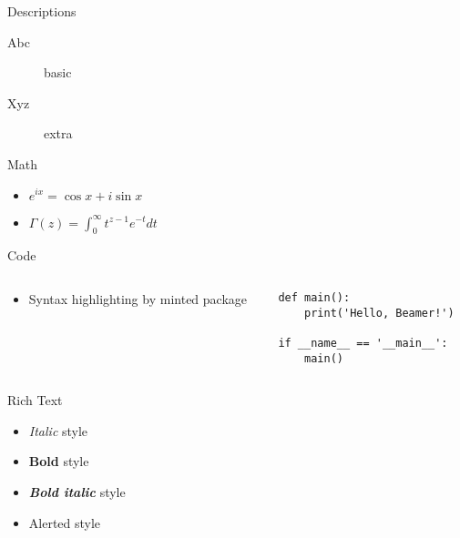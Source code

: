 \documentclass[12pt,t]{beamer}
\begin{document}
\begin{frame}{Descriptions}
  \begin{description}
  \item[Abc] basic
  \item[Xyz] extra
  \end{description}
\end{frame}


\begin{frame}[fragile]{Math}
  \begin{itemize}
    \item $e^{ix} = \cos x + i \sin x$
    \item $\Gamma(z) = \int_0^\infty t^{z-1} e^{-t} dt$
  \end{itemize}
\end{frame}


\begin{frame}[fragile]{Code}
  \begin{columns}
    \begin{column}{0.5\textwidth}
      \begin{itemize}
        \item Syntax highlighting by \alert{minted} package
      \end{itemize}
    \end{column}
    \begin{column}{0.5\textwidth}
      \begin{verbatim}
def main():
    print('Hello, Beamer!')

if __name__ == '__main__':
    main()
      \end{verbatim}
    \end{column}
  \end{columns}
\end{frame}


\begin{frame}{Rich Text}
  \begin{itemize}
  \item \textit{Italic} style
  \item \textbf{Bold} style
  \item \textit{\textbf{Bold italic}} style
  \item \alert{Alerted} style
  \end{itemize}
\end{frame}
\end{document}
